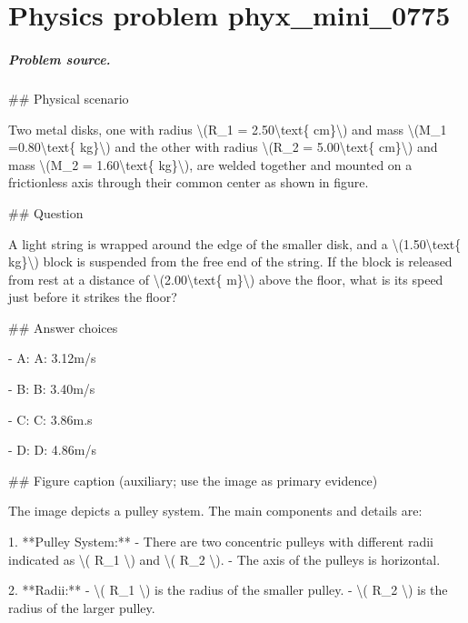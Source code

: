 
\chapter{Physics problem phyx\_mini\_0775}
\label{ch:PhyXMiniProblems_problem_phyx_mini_0775}

\paragraph{Problem source.}
\#\# Physical scenario

Two metal disks, one with radius \textbackslash{}(R\_1 = 2.50\textbackslash{}text\{ cm\}\textbackslash{}) and mass \textbackslash{}(M\_1 =0.80\textbackslash{}text\{ kg\}\textbackslash{}) and the other with radius \textbackslash{}(R\_2 = 5.00\textbackslash{}text\{ cm\}\textbackslash{}) and mass \textbackslash{}(M\_2 = 1.60\textbackslash{}text\{ kg\}\textbackslash{}), are welded together and mounted on a frictionless axis through their common center as shown in figure.

\#\# Question

A light string is wrapped around the edge of the smaller disk, and a \textbackslash{}(1.50\textbackslash{}text\{ kg\}\textbackslash{}) block is suspended from the free end of the string. If the block is released from rest at a distance of \textbackslash{}(2.00\textbackslash{}text\{ m\}\textbackslash{}) above the floor, what is its speed just before it strikes the floor?

\#\# Answer choices

- A: A: 3.12m/s

- B: B: 3.40m/s

- C: C: 3.86m.s

- D: D: 4.86m/s

\#\# Figure caption (auxiliary; use the image as primary evidence)

The image depicts a pulley system. The main components and details are:

1. **Pulley System:** 
   - There are two concentric pulleys with different radii indicated as \textbackslash{}( R\_1 \textbackslash{}) and \textbackslash{}( R\_2 \textbackslash{}).
   - The axis of the pulleys is horizontal.

2. **Radii:** 
   - \textbackslash{}( R\_1 \textbackslash{}) is the radius of the smaller pulley.
   - \textbackslash{}( R\_2 \textbackslash{}) is the radius of the larger pulley.

